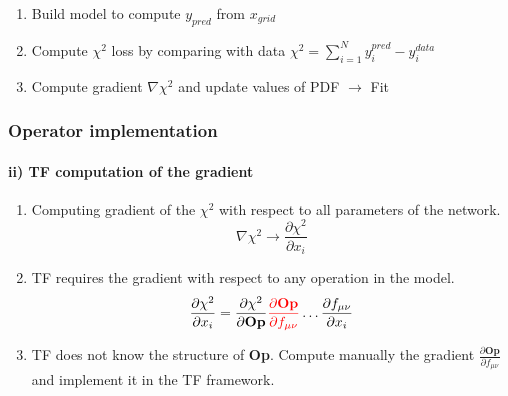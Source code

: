 \documentclass[aspectratio=43]{beamer}
\begin{document}
\begin{frame}
	
	\begin{enumerate}
		\item Build model to compute $y_{pred}$ from $x_{grid}$
		\item Compute $\chi^{2}$ loss by comparing with data $\chi^{2} = \sum_{i = 1}^{N} y_{i}^{pred} - y_{i}^{data}$
		\item Compute gradient $\nabla \chi^{2}$ and update values of PDF $\longrightarrow$ {\color{violet} Fit}
	\end{enumerate}
\end{frame}
	
\begin{frame}

	\frametitle{Operator implementation}
	\framesubtitle{ii) TF computation of the gradient}

	\begin{enumerate} 
		\item Computing gradient of the $\chi^{2}$ with respect to all parameters of the network.
		\begin{equation}
			\nabla \chi^{2} \longrightarrow \frac{\partial \chi^{2}}{\partial x_{i}} \nonumber
		\end{equation}
		\item TF requires the gradient with respect to any operation in the model.
		\begin{equation}
			\frac{\partial \chi^{2}}{\partial x_{i}} =
			\frac{\partial \chi^{2}}{\partial \textbf{Op}}
			{\color{red}\frac{\partial \textbf{Op}}{\partial f_{\mu \nu}}} \ldots
			\frac{\partial f_{\mu \nu}}{\partial x_{i}}
		\end{equation}
		\item TF does not know the structure of \textbf{Op}. Compute manually the gradient $\frac{\partial \textbf{Op}}{\partial f_{\mu \nu}}$ and implement it in the TF framework.
	\end{enumerate}

\end{frame}
\end{document}
